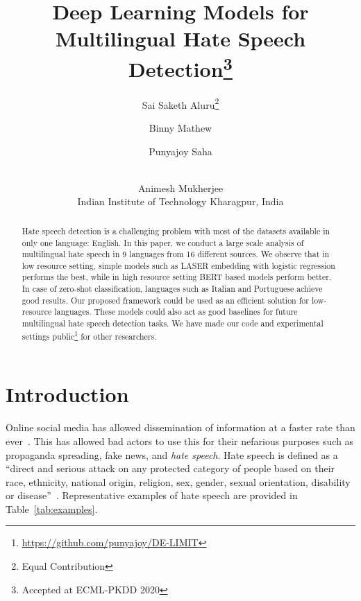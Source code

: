 \documentclass[runningheads]{llncs}
\makeatletter
\newcommand{\printfnsymbol}[1]{\textsuperscript{\@fnsymbol{#1}}}
\makeatother
\begin{document}
\title{Deep Learning Models for Multilingual Hate Speech Detection\thanks{Accepted at ECML-PKDD 2020}}


\author{Sai Saketh Aluru\thanks{Equal Contribution}\and
Binny Mathew\printfnsymbol{2} \and
Punyajoy Saha \and \\
Animesh Mukherjee  \\
Indian Institute of Technology Kharagpur, India
}













\maketitle              \setcounter{footnote}{0}
\begin{abstract}

Hate speech detection is a challenging problem with most of the datasets available in only one language: English. In this paper, we conduct a large scale analysis of multilingual hate speech in 9 languages from 16 different sources. We observe that in low resource setting, simple models such as LASER embedding with logistic regression performs the best, while in high resource setting BERT based models perform better. In case of zero-shot classification, languages such as Italian and Portuguese achieve good results. Our proposed framework could be used as an efficient solution for low-resource languages. These models could also act as good baselines for future multilingual hate speech detection tasks. We have made our code and experimental settings public\footnote{\url{https://github.com/punyajoy/DE-LIMIT}} for other researchers.

\end{abstract}



\section{Introduction}
Online social media has allowed dissemination of information at a faster rate than ever~\cite{mathew2019spread,mathew2019temporal}. This has allowed bad actors to use this for their nefarious purposes such as propaganda spreading, fake news, and \textit{hate speech}. Hate speech is defined as a ``direct and serious attack on any protected category of people based on their race, ethnicity, national origin, religion, sex, gender, sexual orientation, disability or disease''~\cite{elsherief2018hate}. Representative examples of hate speech are provided in Table~\ref{tab:examples}.
\end{document}
